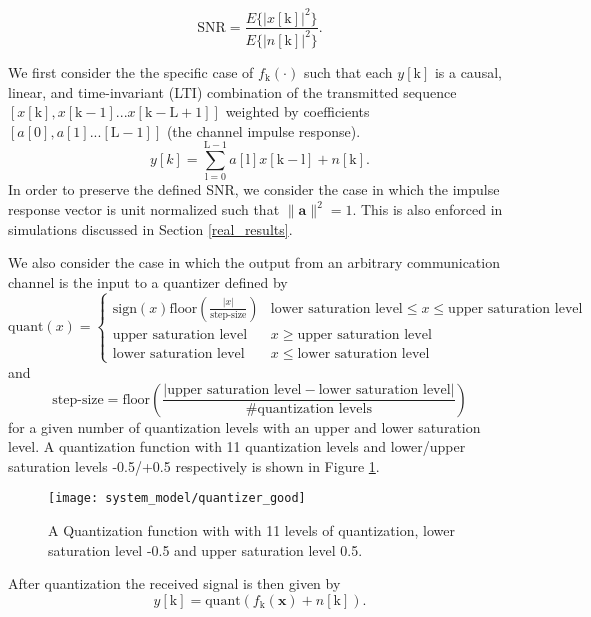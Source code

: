 \begin{equation*}
\text{SNR} = \frac{E\{|x[\text{k}]|^2\}}{E\{|n[\text{k}]|^2\}}.
\end{equation*}
\par
We first consider the the specific case of $f_{\text{k}}(\cdot)$ such that each $y[\text{k}]$ is a causal, linear, and time-invariant (LTI) combination of the transmitted sequence $[x[\text{k}], x[\text{k}-1]... x[\text{k}-\text{L}+1]]$ weighted by coefficients $[a[0], a[1].. . [\text{L}-1]]$ (the channel impulse response). 
\begin{equation}\label{lti_channel}
y[k] = \sum_{\mathrm{\text{l}=0}}^{\mathrm{\text{L}-1}} a[\text{l}]x[\text{k}-\text{l}]+ n[\text{k}].
\end{equation}
In order to preserve the defined SNR, we consider the case in which the impulse response vector is unit normalized such that $\|\mathbf{a}\|^2 =1 $. This is also enforced in simulations discussed in Section \ref{real_results}.
\par
We also consider the case in which the output from an arbitrary communication channel is the input to a quantizer defined by 
\[\text{quant}(x) = 
\begin{cases}
\text{sign}(x)\text{floor}\left(\frac{|x|}{\text{step-size}}\right)& \text{lower saturation level} \leq x \leq \text{upper saturation level}\\
\text{upper saturation level} & x \geq \text{upper saturation level}\\
\text{lower saturation level} & x \leq \text{lower saturation level}
\end{cases}
\]
 and  
 \begin{equation*}
  \text{step-size} =\text{floor}\left(\frac{|\text{upper saturation level}- \text{lower saturation level}|}{\text{\#quantization levels}}\right)
 \end{equation*} for a given number of quantization levels with an upper and lower saturation level. A quantization function with 11 quantization levels and lower/upper saturation levels -0.5/+0.5 respectively is shown in Figure \ref{fig:Quantized Overlay}. 
  \begin{figure}[H]
\centering
	\texttt{[image: system\_model/quantizer\_good]}
			  \caption{A Quantization function with with 11 levels of quantization, lower saturation level -0.5 and upper saturation level 0.5. }
	  \label{fig:Quantized Overlay}
\end{figure}
 
After quantization the received signal is then given by 
\begin{equation}\label{lti_quantized_channel}
y[\text{k}] = \text{quant}(f_{\text{k}}(\mathbf{x}) + n[\text{k}]).
\end{equation}


